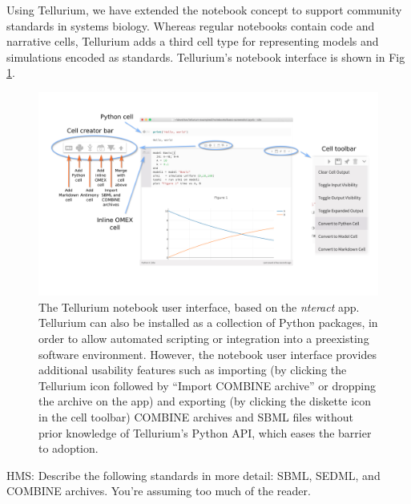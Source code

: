 \documentclass[10pt,letterpaper]{article}
\begin{document}
Using Tellurium, we have extended the notebook concept to support community standards in systems biology. Whereas regular notebooks contain code and narrative cells, Tellurium adds a third cell type for representing models and simulations encoded as standards. Tellurium's notebook interface is shown in Fig \ref{fig:interface}.

\begin{figure}
  \includegraphics[width=\textwidth]{fig-interface.png}
  \caption{The Tellurium notebook user interface, based on the \textit{nteract} app. Tellurium can also be installed as a collection of Python packages, in order to allow automated scripting or integration into a preexisting software environment. However, the notebook user interface provides additional usability features such as importing (by clicking the Tellurium icon followed by ``Import COMBINE archive'' or dropping the archive on the app) and exporting (by clicking the diskette icon in the cell toolbar) COMBINE archives and SBML files without prior knowledge of Tellurium's Python API, which eases the barrier to adoption. }
  \label{fig:interface}
\end{figure}


{\color{red} HMS: Describe the following standards in more detail: SBML, SEDML, and COMBINE archives. You're assuming too much of the reader.}
\end{document}
